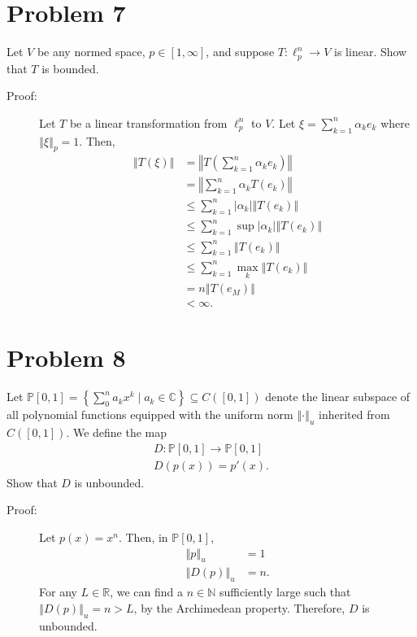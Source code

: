 \documentclass[9pt]{extarticle}
\newcommand{\N}{\mathbb{N}}
\newcommand{\R}{\mathbb{R}}
\newcommand{\C}{\mathbb{C}}
\newcommand{\norm}[1]{\left\Vert #1\right\Vert}
\begin{document}
  \section{Problem 7}%
  Let $V$ be any normed space, $p\in[1,\infty]$, and suppose $T:\ell_{p}^{n}\rightarrow V$ is linear. Show that $T$ is bounded.
  \begin{description}
    \item[Proof:] Let $T$ be a linear transformation from $\ell_{p}^{n}$ to $V$. Let $\xi = \sum_{k=1}^{n}\alpha_ke_k$ where $\norm{\xi}_{p} = 1$. Then,
      \begin{align*}
        \norm{T(\xi)} &= \norm{T\left(\sum_{k=1}^{n}\alpha_ke_k\right)}\\
                      &= \norm{\sum_{k=1}^{n}\alpha_kT(e_k)}\\
                      &\leq \sum_{k=1}^{n}|\alpha_k|\norm{T(e_k)}\\
                      &\leq \sum_{k=1}^{n}\sup|\alpha_k|\norm{T(e_k)}\\
                      &\leq \sum_{k=1}^{n}\norm{T(e_k)}\\
                      &\leq \sum_{k=1}^{n}\max_{k}\norm{T(e_k)}\\
                      &= n\norm{T(e_M)}\\
                      &< \infty.
      \end{align*}
  \end{description}
  \section{Problem 8}%
  Let $\mathbb{P}[0,1] = \left\{\sum_{0}^{n}a_kx^k\mid a_k\in\C\right\}\subseteq C([0,1])$ denote the linear subspace of all polynomial functions equipped with the uniform norm $\norm{\cdot}_{u}$ inherited from $C([0,1])$. We define the map
  \begin{align*}
    D:\mathbb{P}[0,1]\rightarrow \mathbb{P}[0,1]\\
    D(p(x)) = p'(x).
  \end{align*}
  Show that $D$ is unbounded.
  \begin{description}
    \item[Proof:] Let $p(x) = x^n$. Then, in $\mathbb{P}[0,1]$,
      \begin{align*}
        \norm{p}_u &= 1\\
        \norm{D(p)}_u &= n.
      \end{align*}
      For any $L\in \R$, we can find a $n\in \N$ sufficiently large such that $\norm{D(p)}_u = n > L$, by the Archimedean property. Therefore, $D$ is unbounded.
  \end{description}
\end{document}
